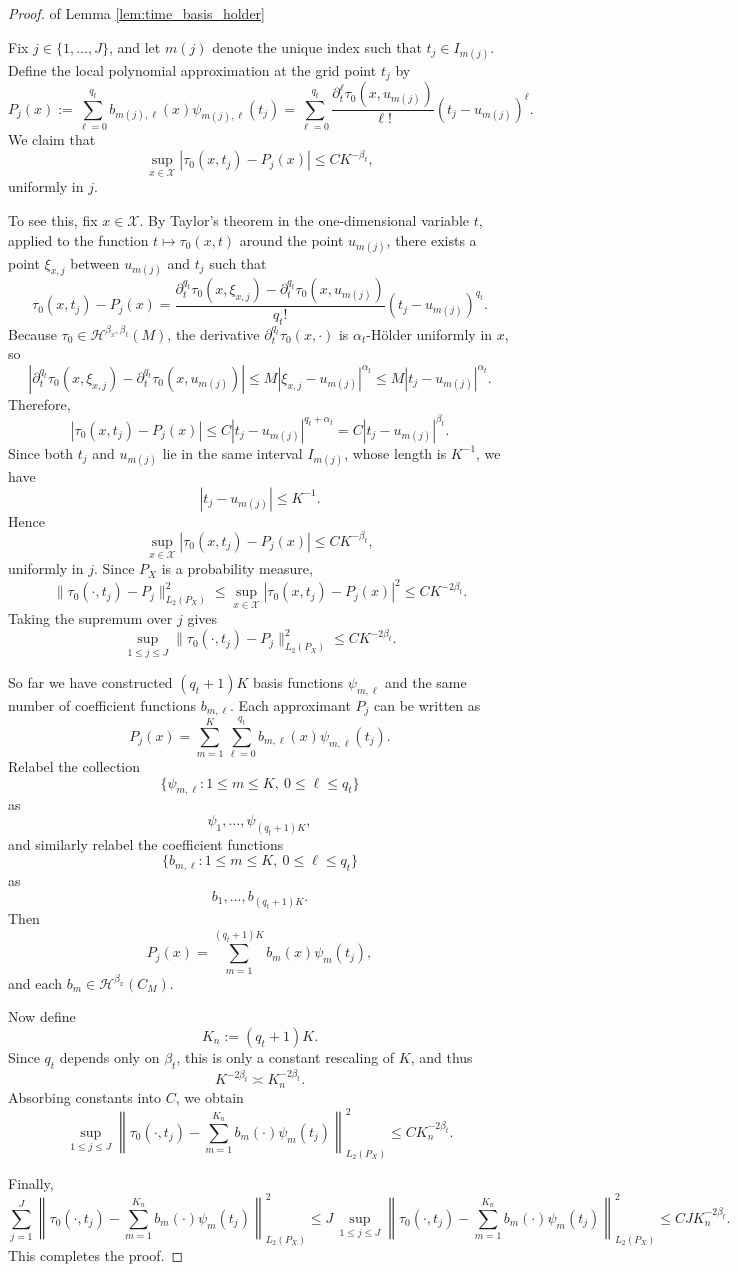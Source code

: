 \documentclass{article}
\begin{document}
\begin{proof}{of Lemma  \ref{lem:time_basis_holder}}
 
Fix \(j\in\{1,\ldots,J\}\), and let \(m(j)\) denote the unique index such that
\(t_j\in I_{m(j)}\). Define the local polynomial approximation at the grid point
\(t_j\) by
\[
P_j(x):=\sum_{\ell=0}^{q_t} b_{m(j),\ell}(x)\psi_{m(j),\ell}(t_j)
=
\sum_{\ell=0}^{q_t}
\frac{\partial_t^\ell \tau_0(x,u_{m(j)})}{\ell!}(t_j-u_{m(j)})^\ell.
\]
We claim that
\[
\sup_{x\in\mathcal X} |\tau_0(x,t_j)-P_j(x)| \le C K^{-\beta_t},
\]
uniformly in \(j\).

To see this, fix \(x\in\mathcal X\). By Taylor's theorem in the one-dimensional
variable \(t\), applied to the function \(t\mapsto \tau_0(x,t)\) around the point
\(u_{m(j)}\), there exists a point \(\xi_{x,j}\) between \(u_{m(j)}\) and \(t_j\) such that
\[
\tau_0(x,t_j)-P_j(x)
=
\frac{\partial_t^{q_t}\tau_0(x,\xi_{x,j})-\partial_t^{q_t}\tau_0(x,u_{m(j)})}{q_t!}
(t_j-u_{m(j)})^{q_t}.
\]
Because \(\tau_0\in \mathcal H^{\beta_x,\beta_t}(M)\), the derivative
\(\partial_t^{q_t}\tau_0(x,\cdot)\) is \(\alpha_t\)-H\"older uniformly in \(x\), so
\[
|\partial_t^{q_t}\tau_0(x,\xi_{x,j})-\partial_t^{q_t}\tau_0(x,u_{m(j)})|
\le
M |\xi_{x,j}-u_{m(j)}|^{\alpha_t}
\le
M |t_j-u_{m(j)}|^{\alpha_t}.
\]
Therefore,
\[
|\tau_0(x,t_j)-P_j(x)|
\le
C |t_j-u_{m(j)}|^{q_t+\alpha_t}
=
C |t_j-u_{m(j)}|^{\beta_t}.
\]
Since both \(t_j\) and \(u_{m(j)}\) lie in the same interval \(I_{m(j)}\), whose length
is \(K^{-1}\), we have
\[
|t_j-u_{m(j)}|\le K^{-1}.
\]
Hence
\[
\sup_{x\in\mathcal X} |\tau_0(x,t_j)-P_j(x)|
\le
C K^{-\beta_t},
\]
uniformly in \(j\). Since \(P_X\) is a probability measure,
\[
\|\tau_0(\cdot,t_j)-P_j\|_{L_2(P_X)}^2
\le
\sup_{x\in\mathcal X} |\tau_0(x,t_j)-P_j(x)|^2
\le
C K^{-2\beta_t}.
\]
Taking the supremum over \(j\) gives
\[
\sup_{1\le j\le J}
\|\tau_0(\cdot,t_j)-P_j\|_{L_2(P_X)}^2
\le
C K^{-2\beta_t}.
\]

So far we have constructed \((q_t+1)K\) basis functions
\(\psi_{m,\ell}\) and the same number of coefficient functions \(b_{m,\ell}\).
Each approximant \(P_j\) can be written as
\[
P_j(x)
=
\sum_{m=1}^K\sum_{\ell=0}^{q_t} b_{m,\ell}(x)\psi_{m,\ell}(t_j).
\]
Relabel the collection
\[
\{\psi_{m,\ell}: 1\le m\le K,\ 0\le \ell\le q_t\}
\]
as
\[
\psi_1,\ldots,\psi_{(q_t+1)K},
\]
and similarly relabel the coefficient functions
\[
\{b_{m,\ell}: 1\le m\le K,\ 0\le \ell\le q_t\}
\]
as
\[
b_1,\ldots,b_{(q_t+1)K}.
\]
Then
\[
P_j(x)=\sum_{m=1}^{(q_t+1)K} b_m(x)\psi_m(t_j),
\]
and each \(b_m\in\mathcal H^{\beta_x}(C_M)\).

Now define
\[
K_n:=(q_t+1)K.
\]
Since \(q_t\) depends only on \(\beta_t\), this is only a constant rescaling of \(K\),
and thus
\[
K^{-2\beta_t}\asymp K_n^{-2\beta_t}.
\]
Absorbing constants into \(C\), we obtain
\[
\sup_{1\le j\le J}
\left\|
\tau_0(\cdot,t_j)-\sum_{m=1}^{K_n} b_m(\cdot)\psi_m(t_j)
\right\|_{L_2(P_X)}^2
\le
C K_n^{-2\beta_t}.
\]

 
Finally,
\[
\sum_{j=1}^J
\left\|
\tau_0(\cdot,t_j)-\sum_{m=1}^{K_n} b_m(\cdot)\psi_m(t_j)
\right\|_{L_2(P_X)}^2
\le
J\,
\sup_{1\le j\le J}
\left\|
\tau_0(\cdot,t_j)-\sum_{m=1}^{K_n} b_m(\cdot)\psi_m(t_j)
\right\|_{L_2(P_X)}^2
\le
C J K_n^{-2\beta_t}.
\]
This completes the proof.
\end{proof}
\end{document}
